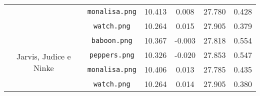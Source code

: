 \begin{table}[H]
\begin{tabular}{cc|cccc}
            & \texttt{monalisa.png} & 10.413 & 0.008 & 27.780 & 0.428 \\
            & \texttt{watch.png} & 10.264 & 0.015 & 27.905 & 0.379 \\
        \midrule
            \multirow{4}{*}{Jarvis, Judice e Ninke}
            & \texttt{baboon.png} & 10.367 & -0.003 & 27.818 & 0.554 \\
            & \texttt{peppers.png} & 10.326 & -0.020 & 27.853 & 0.547 \\
            & \texttt{monalisa.png} & 10.406 & 0.013 & 27.785 & 0.435 \\
            & \texttt{watch.png} & 10.264 & 0.014 & 27.905 & 0.380 \\
        \bottomrule
    \end{tabular}
\end{table}
